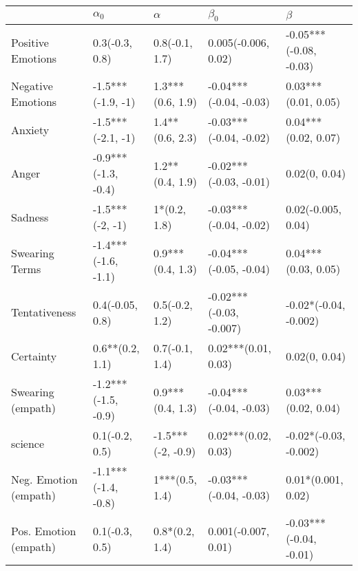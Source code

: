 \begin{tabular}{lllll}
\toprule
{} &           $\alpha_0$ &           $\alpha$ &                $\beta_0$ &                 $\beta$ \\
\midrule
Positive Emotions     &       0.3(-0.3, 0.8) &     0.8(-0.1, 1.7) &      0.005(-0.006, 0.02) &  -0.05***(-0.08, -0.03) \\
Negative Emotions     &    -1.5***(-1.9, -1) &   1.3***(0.6, 1.9) &   -0.04***(-0.04, -0.03) &     0.03***(0.01, 0.05) \\
Anxiety               &    -1.5***(-2.1, -1) &    1.4**(0.6, 2.3) &   -0.03***(-0.04, -0.02) &     0.04***(0.02, 0.07) \\
Anger                 &  -0.9***(-1.3, -0.4) &    1.2**(0.4, 1.9) &   -0.02***(-0.03, -0.01) &           0.02(0, 0.04) \\
Sadness               &      -1.5***(-2, -1) &       1*(0.2, 1.8) &   -0.03***(-0.04, -0.02) &      0.02(-0.005, 0.04) \\
Swearing Terms        &  -1.4***(-1.6, -1.1) &   0.9***(0.4, 1.3) &   -0.04***(-0.05, -0.04) &     0.04***(0.03, 0.05) \\
Tentativeness         &      0.4(-0.05, 0.8) &     0.5(-0.2, 1.2) &  -0.02***(-0.03, -0.007) &   -0.02*(-0.04, -0.002) \\
Certainty             &      0.6**(0.2, 1.1) &     0.7(-0.1, 1.4) &      0.02***(0.01, 0.03) &           0.02(0, 0.04) \\
Swearing (empath)     &  -1.2***(-1.5, -0.9) &   0.9***(0.4, 1.3) &   -0.04***(-0.04, -0.03) &     0.03***(0.02, 0.04) \\
science               &       0.1(-0.2, 0.5) &  -1.5***(-2, -0.9) &      0.02***(0.02, 0.03) &   -0.02*(-0.03, -0.002) \\
Neg. Emotion (empath) &  -1.1***(-1.4, -0.8) &     1***(0.5, 1.4) &   -0.03***(-0.04, -0.03) &      0.01*(0.001, 0.02) \\
Pos. Emotion (empath) &       0.1(-0.3, 0.5) &     0.8*(0.2, 1.4) &      0.001(-0.007, 0.01) &  -0.03***(-0.04, -0.01) \\
\bottomrule
\end{tabular}
